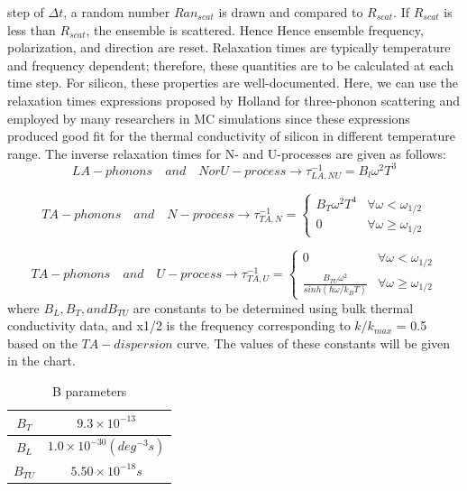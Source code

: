step of $\Delta t$, a random number $Ran_{scat}$ is drawn and compared to $R_{scat}$. If $R_{scat}$ is less than $R_{scat}$, the ensemble is scattered. Hence Hence ensemble
frequency, polarization, and direction are reset. Relaxation times
are typically temperature and frequency dependent; therefore,
these quantities are to be calculated at each time step. For silicon,
these properties are well-documented. Here, we can use the relaxation
times expressions proposed by Holland\cite{hollandanalysis} for three-phonon scattering
and employed by many researchers in MC simulations\cite{monte1,monte2} since these expressions produced good fit for the thermal
conductivity of silicon in different temperature range. The inverse
relaxation times for N- and U-processes are given as follows:
\begin{equation}
LA-phonons \quad  and\quad N or U-process \rightarrow \tau_{LA,NU}^{-1}=B_l \omega^2 T^3
\end{equation}


\begin{equation}
TA-phonons \quad  and\quad N-process \rightarrow \tau_{TA,N}^{-1} =
\begin{cases}
B_T \omega^2 T^4 & \forall \omega < \omega_{1/2}\\
0 & \forall \omega \geq \omega_{1/2}
\end{cases}
\end{equation}

\begin{equation}
TA-phonons\quad  and\quad  U-process \rightarrow \tau_{TA,U}^{-1} =
\begin{cases}
0 & \forall \omega < \omega_{1/2}\\
\frac{B_{TU} \omega^2}{sinh(\hbar \omega / k_B T)} & \forall \omega \geq \omega_{1/2}
\end{cases}
\end{equation}
where $B_L, B_T, and B_{TU}$ are constants to be determined using bulk
thermal conductivity data, and x1/2 is the frequency corresponding
to $k/k_{max}$ = 0.5 based on the $TA-dispersion$ curve. The values of these
constants will be given in the chart\cite{chen2005monte}.\\

\begin{table}[!hbp]
\centering
\begin{tabular}{|c|c|}
\hline $B_T$  &$9.3 \times 10^{-13}$ \\
\hline $B_L$ &  $1.0 \times 10^{-30} (deg^{-3}s)$ \\
\hline $B_{TU}$&$5.50 \times 10^{-18} s$\\
\hline    
\end{tabular}\\
\caption{B parameters}
\end{table}

